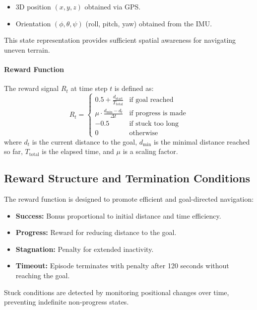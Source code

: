 \documentclass[11pt,twocolumn]{article}
\begin{document}
\begin{itemize}
    \item 3D position $(x, y, z)$ obtained via GPS.
    \item Orientation $(\phi, \theta, \psi)$ (roll, pitch, yaw) obtained from the IMU.
\end{itemize}

This state representation provides sufficient spatial awareness for navigating uneven terrain.

\paragraph{Reward Function}

The reward signal \( R_t \) at time step \( t \) is defined as:
\[
R_t = 
\begin{cases}
0.5 + \frac{d_{\text{start}}}{T_{\text{total}}} & \text{if goal reached} \\
\mu \cdot \frac{d_{\min} - d_t}{\Delta t} & \text{if progress is made} \\
-0.5 & \text{if stuck too long} \\
0 & \text{otherwise}
\end{cases}
\]
where \( d_t \) is the current distance to the goal, \( d_{\min} \) is the minimal distance reached so far, \( T_{\text{total}} \) is the elapsed time, and \( \mu \) is a scaling factor.

\subsection{Reward Structure and Termination Conditions}

The reward function is designed to promote efficient and goal-directed navigation:

\begin{itemize}
    \item \textbf{Success:} Bonus proportional to initial distance and time efficiency.
    \item \textbf{Progress:} Reward for reducing distance to the goal.
    \item \textbf{Stagnation:} Penalty for extended inactivity.
    \item \textbf{Timeout:} Episode terminates with penalty after 120 seconds without reaching the goal.
\end{itemize}

Stuck conditions are detected by monitoring positional changes over time, preventing indefinite non-progress states.
\end{document}
